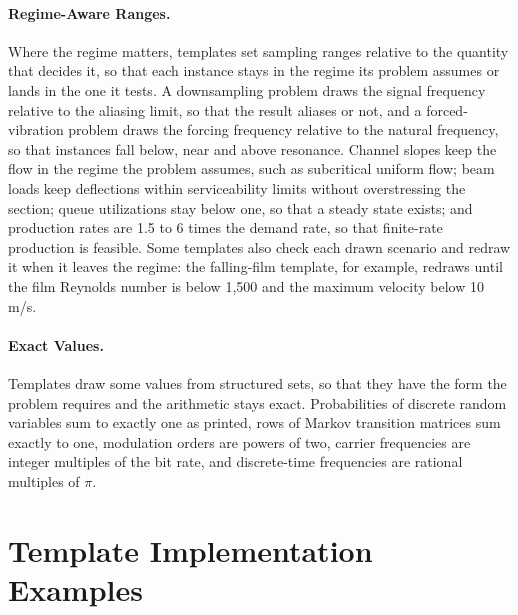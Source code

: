 \paragraph{Regime-Aware Ranges.} Where the regime matters, templates set sampling ranges relative to
the quantity that decides it, so that each instance stays in the regime its problem assumes or lands
in the one it tests.
A downsampling problem draws the signal frequency relative to the aliasing limit, so that the result
aliases or not, and a forced-vibration problem draws the forcing frequency relative to the natural
frequency, so that instances fall below, near and above resonance.
Channel slopes keep the flow in the regime the problem assumes, such as subcritical uniform flow;
beam loads keep deflections within serviceability limits without overstressing the section; queue
utilizations stay below one, so that a steady state exists; and production rates are 1.5 to 6 times
the demand rate, so that finite-rate production is feasible.
Some templates also check each drawn scenario and redraw it when it leaves the regime: the
falling-film template, for example, redraws until the film Reynolds number is below 1,500 and the
maximum velocity below 10\,m/s.

\paragraph{Exact Values.} Templates draw some values from structured sets, so that they have the
form the problem requires and the arithmetic stays exact.
Probabilities of discrete random variables sum to exactly one as printed, rows of Markov transition
matrices sum exactly to one, modulation orders are powers of two, carrier frequencies are integer
multiples of the bit rate, and discrete-time frequencies are rational multiples of $\pi$.


\section{Template Implementation Examples}
\label{sec:appendix_template_examples}

